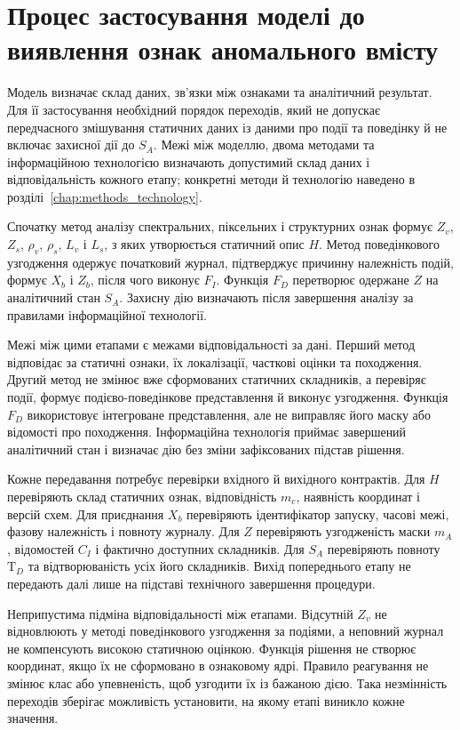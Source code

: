 \section{Процес застосування моделі до виявлення ознак аномального вмісту}
\label{sec:detection_process_model}

Модель визначає склад даних, зв’язки між ознаками та аналітичний результат. Для її застосування необхідний порядок переходів, який не допускає передчасного змішування статичних даних із даними про події та поведінку й не включає захисної дії до $S_A$. Межі між моделлю, двома методами та інформаційною технологією визначають допустимий склад даних і відповідальність кожного етапу; конкретні методи й технологію наведено в розділі~\ref{chap:methods_technology}.

Спочатку метод аналізу спектральних, піксельних і структурних ознак формує $Z_v$, $Z_s$, $\rho_v$, $\rho_s$, $L_v$ і $L_s$, з яких утворюється статичний опис $H$. Метод поведінкового узгодження одержує початковий журнал, підтверджує причинну належність подій, формує $X_b$ і $Z_b$, після чого виконує $F_I$. Функція $F_D$ перетворює одержане $Z$ на аналітичний стан $S_A$. Захисну дію визначають після завершення аналізу за правилами інформаційної технології.

Межі між цими етапами є межами відповідальності за дані. Перший метод відповідає за статичні ознаки, їх локалізації, часткові оцінки та походження. Другий метод не змінює вже сформованих статичних складників, а перевіряє події, формує подієво-поведінкове представлення й виконує узгодження. Функція $F_D$ використовує інтегроване представлення, але не виправляє його маску або відомості про походження. Інформаційна технологія приймає завершений аналітичний стан і визначає дію без зміни зафіксованих підстав рішення.

Кожне передавання потребує перевірки вхідного й вихідного контрактів. Для $H$ перевіряють склад статичних ознак, відповідність $m_c$, наявність координат і версій схем. Для приєднання $X_b$ перевіряють ідентифікатор запуску, часові межі, фазову належність і повноту журналу. Для $Z$ перевіряють узгодженість маски $m_A$, відомостей $C_I$ і фактично доступних складників. Для $S_A$ перевіряють повноту $\mathrm T_D$ та відтворюваність усіх його складників. Вихід попереднього етапу не передають далі лише на підставі технічного завершення процедури.

Неприпустима підміна відповідальності між етапами. Відсутній $Z_v$ не відновлюють у методі поведінкового узгодження за подіями, а неповний журнал не компенсують високою статичною оцінкою. Функція рішення не створює координат, якщо їх не сформовано в ознаковому ядрі. Правило реагування не змінює клас або упевненість, щоб узгодити їх із бажаною дією. Така незмінність переходів зберігає можливість установити, на якому етапі виникло кожне значення.

